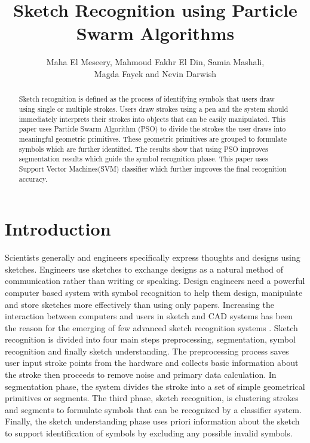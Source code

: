 \documentclass[a4paper,10pt]{IEEEconf}
\title{Sketch Recognition using Particle Swarm Algorithms}
\author{Maha El Meseery,  Mahmoud Fakhr El Din,  Samia Mashali,
\\  Magda Fayek and Nevin Darwish}
\begin{document}
\maketitle
\begin{abstract}
Sketch recognition is defined as the process of identifying symbols that users draw using single or multiple strokes. Users draw strokes using a pen and the system should immediately interprets their strokes into objects that can be easily manipulated. This paper uses Particle Swarm Algorithm (PSO) to divide the strokes the user draws into meaningful geometric primitives. These geometric primitives are grouped to formulate symbols which are further identified. The results show that using PSO improves segmentation results which guide the symbol recognition phase. This paper uses Support Vector Machines(SVM) classifier which further improves the final recognition accuracy.  %
\end{abstract}
\section{Introduction}
Scientists generally and engineers specifically express thoughts and designs using sketches. Engineers use sketches to exchange designs as a natural method of communication rather than writing or speaking. %
Design engineers need a powerful computer based system with symbol recognition to help them design, manipulate and store sketches more effectively than using only papers. Increasing the interaction between computers and users in sketch and CAD systems has been the reason for the emerging of few advanced sketch recognition systems \cite{CAD}. %
Sketch recognition is divided into four main steps preprocessing, segmentation, symbol recognition and finally sketch understanding. The preprocessing process saves user input stroke points from the hardware and collects basic information about the stroke then proceeds to remove noise and primary data calculation. In segmentation phase, the system divides the stroke into a set of simple geometrical primitives or segments. The third phase, sketch recognition, is clustering strokes and segments to formulate symbols that can be recognized by a classifier system. Finally, the sketch understanding phase uses priori information about the sketch to support identification of symbols by excluding any possible invalid symbols. 
\end{document}
